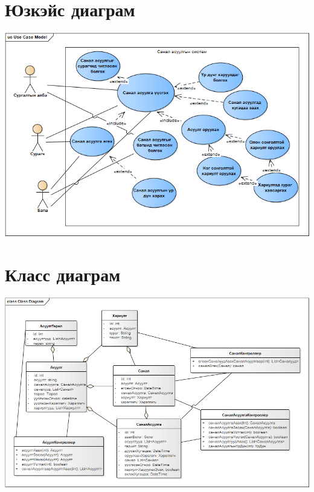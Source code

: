 \documentclass[12pt]{article}
\begin{document}
 	\section{Юзкэйс диаграм}
		\includegraphics[scale=0.6]{usecase}
	\section{Класс диаграм}
		\includegraphics[angle=90,scale=0.6]{class_diagram}
	
\end{document}
